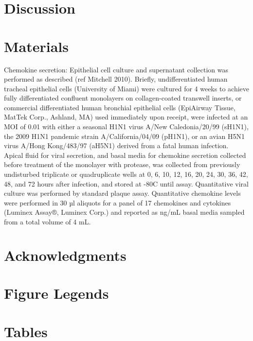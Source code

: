 \documentclass[10pt]{article}
\begin{document}
\section*{Discussion}



\section*{Materials}

Chemokine secretion:  Epithelial cell culture and supernatant collection was performed as described (ref Mitchell 2010).  Briefly, undifferentiated human tracheal epithelial cells (University of Miami) were cultured for 4 weeks to achieve fully differentiated confluent monolayers on collagen-coated transwell inserts, or commercial differentiated human bronchial epithelial cells (EpiAirway Tissue, MatTek Corp., Ashland, MA) used immediately upon receipt, were infected at an MOI of 0.01 with either a seasonal H1N1 virus A/New Caledonia/20/99 (sH1N1), the 2009 H1N1 pandemic strain A/California/04/09 (pH1N1), or an avian H5N1 virus A/Hong Kong/483/97 (aH5N1) derived from a fatal human infection.  Apical fluid for viral secretion, and basal media for chemokine secretion collected before treatment of the monolayer with protease, was collected from previously undisturbed triplicate or quadruplicate wells at 0, 6, 10, 12, 16, 20, 24, 30, 36, 42, 48, and 72 hours after infection, and stored at -80C until assay.  Quantitative viral culture was performed by standard plaque assay.  Quantitative chemokine levels were performed in 30 µl aliquots for a panel of 17 chemokines and cytokines (Luminex Assay®, Luminex Corp.) and reported as ng/mL basal media sampled from a total volume of 4 mL.

\section*{Acknowledgments}




\section*{Figure Legends}


\section*{Tables}
\end{document}
